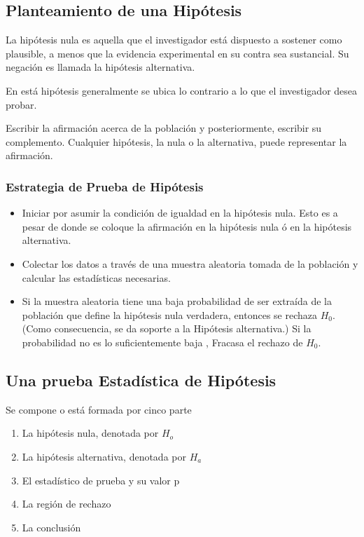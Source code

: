 \subsection{Planteamiento de una Hipótesis}


La hipótesis nula es aquella que el investigador
está dispuesto a sostener como plausible, a
menos que la evidencia experimental en su
contra sea sustancial. Su negación es llamada la
hipótesis alternativa.

En está hipótesis generalmente se ubica lo
contrario a lo que el investigador desea probar.


Escribir la afirmación acerca de la población y posteriormente, escribir
su complemento. Cualquier hipótesis, la nula o la alternativa, puede
representar la afirmación.


\subsubsection{Estrategia de Prueba de Hipótesis}

\begin{itemize}
    \item Iniciar por asumir la condición de igualdad en la hipótesis nula.
          Esto es a pesar de donde se coloque la afirmación en la hipótesis nula ó
          en la hipótesis alternativa.
    \item Colectar los datos a través de una muestra aleatoria tomada de la
          población y calcular las estadísticas necesarias.
    \item Si la muestra aleatoria tiene una baja probabilidad de ser extraída de
          la población que define la hipótesis nula verdadera, entonces se
          rechaza $H_0$. (Como consecuencia, se da soporte a la Hipótesis alternativa.)
          Si la probabilidad no es lo suficientemente baja , Fracasa el rechazo de $H_0$.
\end{itemize}


\subsection{Una prueba Estadística de Hipótesis}

Se compone o está formada por cinco parte
\begin{enumerate}
    \item La hipótesis nula, denotada por $H_o$
    \item La hipótesis alternativa, denotada por $H_a$
    \item El estadístico de prueba y su valor p
    \item La región de rechazo
    \item La conclusión
\end{enumerate}


